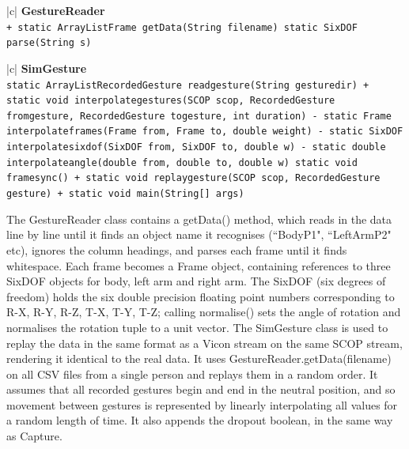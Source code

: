 \documentclass[12pt,a4,notitlepage]{report}
\renewcommand{\_}{\texttt{\symbol{95}}}
\newcommand{\<}{\texttt{\symbol{60}}}
\renewcommand{\>}{\texttt{\symbol{62}}}
\newcommand{\class}[1]{\textbf{#1}}
\newcommand{\variable}[1]{\texttt{#1}}
\begin{document}
{\begin{tabular}{|c|} \hline 
\class{GestureReader} \\ \hline
{}
{ \variable{+ static ArrayList\<Frame\> getData(String filename) \newline
static SixDOF parse(String s)
} } \\ \hline
\end{tabular}

\begin{tabular}{|c|} \hline 
\class{SimGesture} \\ \hline
{}
{ \variable{static ArrayList\<RecordedGesture\> read\_gesture(String gesture\_dir) \newline
+ static void interpolate\_gestures(SCOP scop, RecordedGesture from\_gesture, RecordedGesture to\_gesture, int duration) \newline
- static Frame interpolate\_frames(Frame from, Frame to, double weight) \newline
- static SixDOF interpolate\_sixdof(SixDOF from, SixDOF to, double w) \newline
- static double interpolate\_angle(double from, double to, double w) \newline
static void framesync() \newline
+ static void replay\_gesture(SCOP scop, RecordedGesture gesture) \newline
+ static void main(String[] args)
} } \\ \hline
\end{tabular}

The GestureReader class contains a getData() method, which reads in the data line by line until it finds an object name it recognises (``BodyP1", ``LeftArmP2" etc), ignores the column headings, and parses each frame until it finds whitespace. Each frame becomes a Frame object, containing references to three SixDOF objects for body, left arm and right arm. The SixDOF (six degrees of freedom) holds the six double precision floating point numbers corresponding to \<R-X\>, \<R-Y\>, \<R-Z\>, \<T-X\>, \<T-Y\>, \<T-Z\>; calling normalise() sets the angle of rotation and normalises the rotation tuple to a unit vector.
The SimGesture class is used to replay the data in the same format as a Vicon stream on the same SCOP stream, rendering it identical to the real data. It uses  GestureReader.getData(filename) on all CSV files from a single person and replays them in a random order. It assumes that all recorded gestures begin and end in the neutral position, and so movement between gestures is represented by linearly interpolating all values for a random length of time. It also appends the dropout boolean, in the same way as Capture.

}
\end{document}
